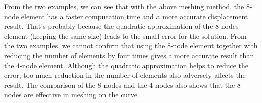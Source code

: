 \noindent
From the two examples, we can see that with the above meshing method, the 8-node element has a faster computation time and a more accurate displacement result.
That's probably because the quadratic approximation of the 8-nodes element (keeping the same size) leads to the small error for the solution.
\vspace{0.38cm}
\newline
From the two examples, we cannot confirm that using the 8-node element together with reducing the number of elements by four times gives a more accurate result than the 4-node element.
Although the quadratic approximation helps to reduce the error, too much reduction in the number of elements also adversely affects the result.
\vspace{0.01cm}
\newline
The comparison of the 8-nodes and the 4-nodes also shows that the 8-nodes are effective in meshing on the curve.
